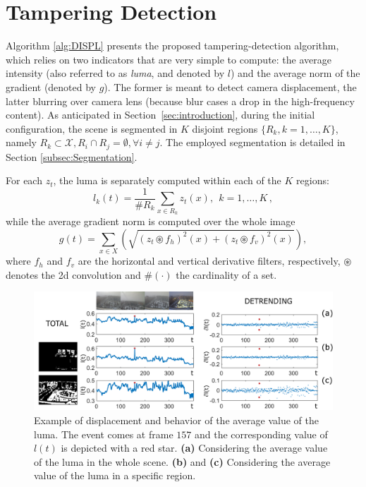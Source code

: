 \documentclass{llncs}
\begin{document}
\section{Tampering Detection}\label{sec:propSol}

Algorithm \ref{alg:DISPL} presents the proposed tampering-detection algorithm, which relies on two indicators that are very simple to compute: the average intensity (also referred to as \emph{luma}, and denoted by $l$) and the average norm of the gradient (denoted by $g$). The former is meant to detect camera displacement, the latter blurring over camera lens (because blur cases a drop in the high-frequency content). As anticipated in Section~\ref{sec:introduction}, during the initial configuration, the scene is segmented in $K$ disjoint regions $\{R_k, k = 1,\dots,K\}$, namely $R_k \subset \mathcal{X}, R_i \cap R_j = \emptyset, \forall i \neq j$. The employed segmentation is detailed in Section \ref{subsec:Segmentation}. 

For each $z_t$, the luma is separately computed within each of the $K$ regions:
\begin{equation}\label{eq:lumaRegions}
l_k(t) =\frac{1}{\#R_k} \sum_{x \in R_k} z_t(x), \ \ k = 1, \dots, K\,,
\end{equation}
while the average gradient norm is computed over the whole image
\begin{equation}
\label{eq:normaGradiente}
g(t) = \sum_{x \in X} \left (\sqrt{\left(z_t \circledast f_h\right)^2(x) + \left(z_t \circledast f_v\right)^2(x)}\right),
\end{equation}
where $f_h$ and $f_v$ are the horizontal and vertical derivative filters, respectively, $\circledast$ denotes the 2d convolution and $\#(\cdot)$ the cardinality of a set.

\begin{figure}[tb]
\centering
\includegraphics[width=1\linewidth]{Immagini/indicatori}
\caption{Example of displacement and behavior of the average value of the luma. The event comes at frame $157$ and the corresponding value of $l(t)$ is depicted with a red star. \textbf{(a)} Considering the average value of the luma in the whole scene. \textbf{(b)} and \textbf{(c)} Considering the average value of the luma in a specific region.}
\label{fig:indicatori} 
\end{figure}
\end{document}
